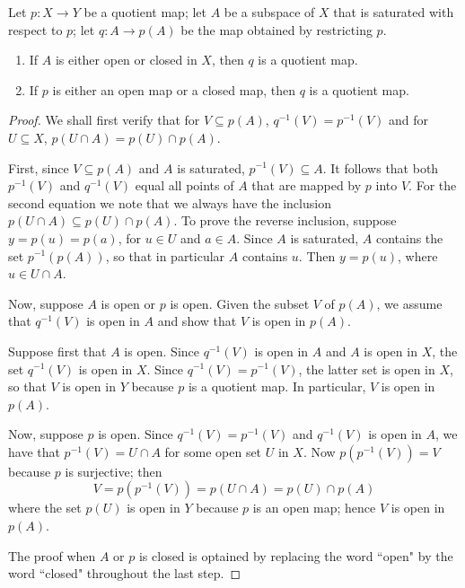 \documentclass[12pt, a4paper, oneside, openright, titlepage]{book}
\begin{document}
\begin{theorem}
    Let $p:X\rightarrow Y$ be a quotient map; let $A$ be a subspace of $X$ that is saturated with respect to $p$; let $q:A\rightarrow p(A)$ be the map obtained by restricting $p$. \begin{enumerate}
        \item If $A$ is either open or closed in $X$, then $q$ is a quotient map.
        \item If $p$ is either an open map or a closed map, then $q$ is a quotient map.
    \end{enumerate}
\end{theorem}
\begin{proof}
    We shall first verify that for $V \subseteq p(A)$, $q^{-1}(V) = p^{-1}(V)$ and for $U \subseteq X$, $p(U\cap A) = p(U)\cap p(A)$.

    First, since $V \subseteq p(A)$ and $A$ is saturated, $p^{-1}(V) \subseteq A$. It follows that both $p^{-1}(V)$ and $q^{-1}(V)$ equal all points of $A$ that are mapped by $p$ into $V$. For the second equation we note that we always have the inclusion $p(U\cap A) \subseteq p(U)\cap p(A)$. To prove the reverse inclusion, suppose $y = p(u) = p(a)$, for $u \in U$ and $a \in A$. Since $A$ is saturated, $A$ contains the set $p^{-1}(p(A))$, so that in particular $A$ contains $u$. Then $y = p(u)$, where $u \in U\cap A$.

    Now, suppose $A$ is open or $p$ is open. Given the subset $V$ of $p(A)$, we assume that $q^{-1}(V)$ is open in $A$ and show that $V$ is open in $p(A)$.

    Suppose first that $A$ is open. Since $q^{-1}(V)$ is open in $A$ and $A$ is open in $X$, the set $q^{-1}(V)$ is open in $X$. Since $q^{-1}(V) = p^{-1}(V)$, the latter set is open in $X$, so that $V$ is open in $Y$ because $p$ is a quotient map. In particular, $V$ is open in $p(A)$.

    Now, suppose $p$ is open. Since $q^{-1}(V) = p^{-1}(V)$ and $q^{-1}(V)$ is open in $A$, we have that $p^{-1}(V) = U\cap A$ for some open set $U$ in $X$. Now $p(p^{-1}(V)) = V$ because $p$ is surjective; then \begin{equation*}
        V = p(p^{-1}(V)) = p(U\cap A) = p(U)\cap p(A)
    \end{equation*}
    where the set $p(U)$ is open in $Y$ because $p$ is an open map; hence $V$ is open in $p(A)$.

    The proof when $A$ or $p$ is closed is optained by replacing the word ``open" by the word ``closed" throughout the last step.
\end{proof}
\end{document}
